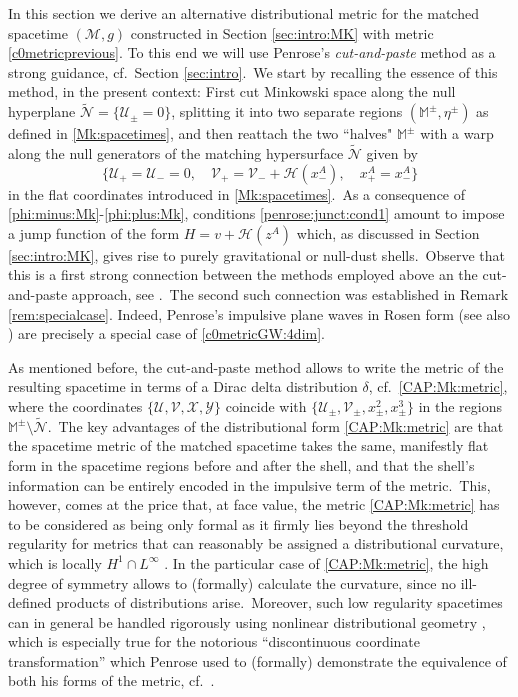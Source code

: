 \documentclass[11pt]{article}
\numberwithin{equation}{section}
\def\Mkpm{\mathbb{M}^{\pm}}
\def\flatpm{\eta^{\pm}}
\newcommand{\cx}{\mathcal{X}}
\newcommand\N{\mathcal N}
\newcommand\M{\mathcal M}
\newcommand{\cu}{\mathcal{U}}
\newcommand{\cv}{\mathcal{V}}
\newcommand{\nullhyp}{\widetilde{\N}}
\begin{document}
In this section we derive an alternative distributional metric for the matched spacetime $(\M,g)$ constructed in Section \ref{sec:intro:MK} with metric \eqref{c0metricprevious}. To this end we will use Penrose's \textit{cut-and-paste} method \cite{Penrose:1972xrn} as a strong guidance, cf.\ Section \ref{sec:intro}.\ We start by recalling the essence of this method, in the present context: First cut Minkowski space along the null hyperplane $\nullhyp=\{{\mathcal U}_\pm=0\}$, splitting it into two separate regions $(\Mkpm,\flatpm)$ as defined in \eqref{Mk:spacetimes}, and then reattach the two ``halves" $\Mkpm$ with a warp along the null generators of the matching hypersurface $\nullhyp$
given by 
\begin{equation}
\label{penrose:junct:cond1}\bigl\{\cu_+=\cu_-=0,\quad\cv_+=\cv_-+\mathcal{H}(x_-^A),\quad x_+^A=x_-^A\bigr\}
\end{equation}
in the flat coordinates introduced in \eqref{Mk:spacetimes}.\ As a consequence of \eqref{phi:minus:Mk}-\eqref{phi:plus:Mk}, conditions \eqref{penrose:junct:cond1} amount to impose a jump function of the form $H=v+\mathcal{H}(z^A)$ which, as discussed in Section \ref{sec:intro:MK}, gives rise to purely gravitational or null-dust shells.\ Observe that this is a first strong connection between the methods employed above an the cut-and-paste approach, see \cite[Sec.\ 6]{manzano2021null}.\  The second such connection was established in Remark \ref{rem:specialcase}. Indeed, Penrose's impulsive plane waves in Rosen form \cite[p.\ 103]{Penrose:1972xrn} (see also \cite{AB:97,PV:98}) are precisely a special case of \eqref{c0metricGW:4dim}. 

As mentioned before, the cut-and-paste method allows to write 
the metric of the resulting spacetime in terms of a Dirac delta distribution $\delta$, cf.\ \eqref{CAP:Mk:metric}, where the coordinates $\{\cu,\cv,\cx,\mathcal{Y}\}$ coincide with $\{\cu_{\pm},\cv_{\pm},x_{\pm}^2,x_{\pm}^3\}$ in the regions $\Mkpm\setminus\nullhyp$.\ The key advantages of the distributional form \eqref{CAP:Mk:metric} are that the spacetime metric of the matched spacetime takes the same, manifestly flat form in the spacetime regions before and after the shell, and that the shell’s information can be entirely encoded in the impulsive term of the metric.\ This, however, comes at the price that, at face value, the metric \eqref{CAP:Mk:metric} has to be considered as being only formal as it firmly lies beyond the threshold regularity for metrics that can reasonably be assigned a distributional curvature, which is locally $H^1\cap L^\infty$ \cite{geroch1987strings,lefloch2007definition,SV:09}. In the particular case of \eqref{CAP:Mk:metric}, the high degree of symmetry allows to (formally) calculate the curvature, since no ill-defined products of distributions arise.\ Moreover, such low regularity spacetimes can in general be handled rigorously using nonlinear distributional geometry \cite[Ch.\ 3]{grosser2013geometric}, which is especially true for the notorious ``discontinuous coordinate transformation'' which Penrose used to (formally) demonstrate the equivalence of both his forms of the metric, cf.\ \cite{KS:99,samann2023cut}.
\end{document}
